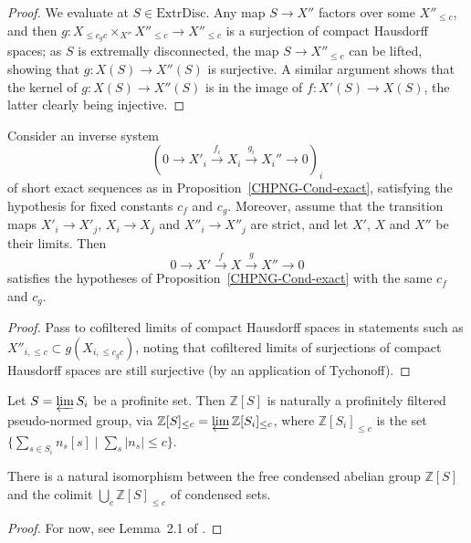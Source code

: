 \begin{proof}
  We evaluate at $S\in \mathrm{ExtrDisc}$.
  Any map $S\to X''$ factors over some $X''_{\leq c}$,
  and then $g: X_{\leq c_gc}\times_{X''} X''_{\leq c}\to X''_{\leq c}$ is a surjection of compact Hausdorff spaces;
  as $S$ is extremally disconnected, the map $S\to X''_{\leq c}$ can be lifted,
  showing that $g: X(S)\to X''(S)$ is surjective.
  A similar argument shows that the kernel of $g: X(S)\to X''(S)$ is in the image of $f: X'(S)\to X(S)$,
  the latter clearly being injective.
\end{proof}

\begin{proposition}
  \label{CHPNG-Cond-exact-lim}
  Consider an inverse system
  \[ (0\to X'_i\xrightarrow{f_i} X_i\xrightarrow{g_i} X_i''\to 0)_i \]
  of short exact sequences as in Proposition~\ref{CHPNG-Cond-exact},
  satisfying the hypothesis for fixed constants $c_f$ and $c_g$.
  Moreover, assume that the transition maps $X'_i\to X'_j$, $X_i\to X_j$ and $X''_i\to X''_j$ are strict, and let $X'$, $X$ and $X''$ be their limits.
  Then
  \[ 0\to X'\xrightarrow{f} X\xrightarrow{g} X''\to 0 \]
  satisfies the hypotheses of Proposition~\ref{CHPNG-Cond-exact} with the same $c_f$ and $c_g$.
\end{proposition}

\begin{proof}
  Pass to cofiltered limits of compact Hausdorff spaces in statements such as $X''_{i,\leq c}\subset g(X_{i,\leq c_g c})$,
  noting that cofiltered limits of surjections of compact Hausdorff spaces are still surjective (by an application of Tychonoff).
\end{proof}

\begin{lemma}
  \label{free-png}
  Let $S = \varprojlim S_i$ be a profinite set.
  Then $\mathbb Z[S]$ is naturally a profinitely filtered pseudo-normed group,
  via $\mathbb Z[S]_{\le c} = \varprojlim \mathbb Z[S_i]_{\le c}$,
  where $\mathbb Z[S_i]_{\le c}$ is the set $\{\sum_{s \in S_i} n_s[s] \mid \sum_s |n_s| \le c\}$.

  There is a natural isomorphism between the free condensed abelian group $\mathbb Z[S]$
  and the colimit $\bigcup_c \mathbb Z[S]_{\le c}$ of condensed sets.
\end{lemma}

\begin{proof}
  For now, see Lemma~2.1 of \cite{Analytic}.
\end{proof}

